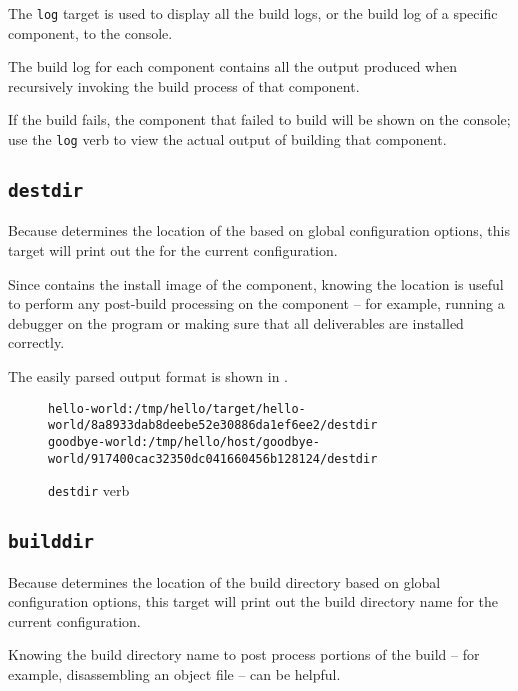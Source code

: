 The \texttt{log} target is used to display all the build logs, or the
build log of a specific component, to the console.

The build log for each component contains all the output produced when
recursively invoking the build process of that component.

If the build fails, the component that failed to build will be shown
on the console; use the \texttt{log} verb to view the actual output of
building that component.

\subsection{\texttt{destdir}}\label{usinglmsbw:destdir}

Because \lmsbw determines the location of the \destdir based on global
configuration options, this target will print out the \destdir for the
current configuration.

Since \destdir contains the install image of the component, knowing
the \destdir location is useful to perform any post-build processing
on the component -- for example, running a debugger on the program or
making sure that all deliverables are installed correctly.

The easily parsed output format is shown in
.

\begin{figure}[tbh]
\hrulefill
\begin{scriptsize}
\begin{verbatim}
hello-world:/tmp/hello/target/hello-world/8a8933dab8deebe52e30886da1ef6ee2/destdir
goodbye-world:/tmp/hello/host/goodbye-world/917400cac32350dc041660456b128124/destdir
\end{verbatim}
\end{scriptsize}
\hrulefill
\caption{\texttt{destdir} verb}\label{usinglmsbw:destdir-verb}
\end{figure}

\subsection{\texttt{builddir}}\label{usinglmsbw:builddir}

Because \lmsbw determines the location of the build directory based on
global configuration options, this target will print out the build
directory name for the current configuration.

Knowing the build directory name to post process portions of the build
-- for example, disassembling an object file -- can be helpful.

